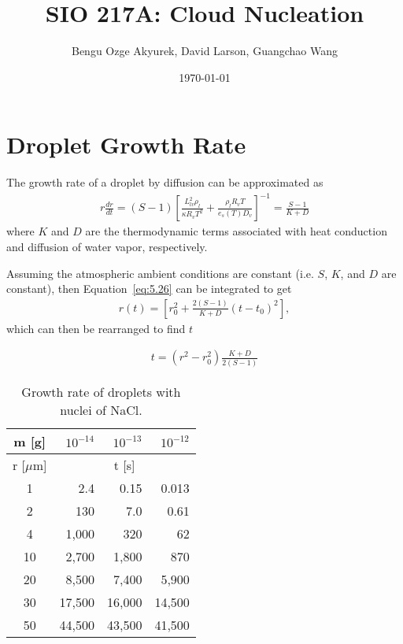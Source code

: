 \documentclass[]{article}
\title{SIO 217A: Cloud Nucleation}
\author{Bengu Ozge Akyurek, David Larson, Guangchao Wang}
\date{\today}
\newcommand{\ra}[1]{\renewcommand{\arraystretch}{#1}}
\begin{document}
\maketitle

\section{Droplet Growth Rate}

The growth rate of a droplet by diffusion can be approximated as
\begin{align}
    \label{eq:5.26}
    r \frac{dr}{dt} = (S - 1) \left[ \frac{L_{lv}^2 \rho_l}{\kappa R_v T^2} + \frac{\rho_l R_v T}{e_s(T) D_v} \right] ^{-1} = \frac{S - 1}{K + D}
\end{align}
where $K$ and $D$ are the thermodynamic terms associated with heat conduction
and diffusion of water vapor, respectively.

Assuming the atmospheric ambient conditions are constant (i.e. $S$, $K$, and
$D$ are constant), then Equation~\ref{eq:5.26} can be integrated to get
\begin{align}
    \label{eq:5.27}
    r(t) = \left[ r_0^2 + \frac{2(S -1)}{K + D}(t - t_0)^2 \right] ,
\end{align}
which can then be rearranged to find $t$

\begin{align}
    t = (r^2 - r_0^2) \frac{K + D}{2(S - 1)}
\end{align}

\begin{table}[h]
    \centering
    \caption{Growth rate of droplets with nuclei of NaCl.}

    \ra{1.2}
    \begin{tabular}{@{} c r r r @{}}
        \\
        \toprule
        m [g] & $10^{-14}$ & $10^{-13}$ & $10^{-12}$ \\
        \midrule
        r [$\mu$m] & \multicolumn{3}{c}{t [s]} \\
        \midrule
        1  & 2.4    & 0.15   & 0.013 \\
        2  & 130    & 7.0    & 0.61 \\
        4  & 1,000  & 320    & 62 \\
        10 & 2,700  & 1,800  & 870 \\
        20 & 8,500  & 7,400  & 5,900 \\
        30 & 17,500 & 16,000 & 14,500 \\
        50 & 44,500 & 43,500 & 41,500 \\
        \bottomrule
    \end{tabular}
\end{table}
\end{document}

